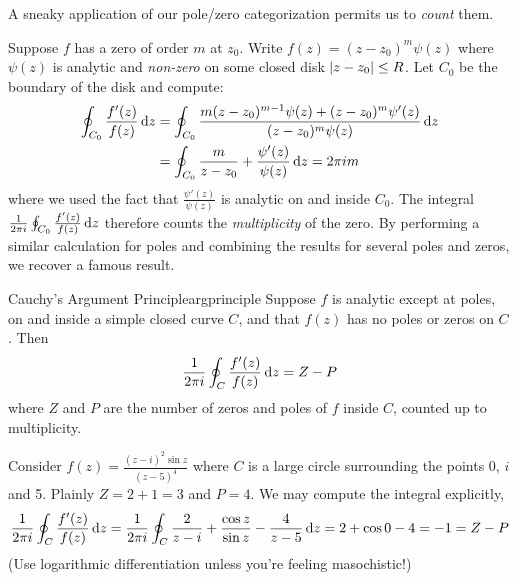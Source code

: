 
A sneaky application of our pole/zero categorization permits us to \emph{count} them.\smallbreak

Suppose $f$ has a zero of order $m$ at $z_0$. Write $f(z)=(z-z_0)^m\psi(z)$ where $\psi(z)$ is analytic and \emph{non-zero} on some closed disk $\left| z-z_0\right|\le R$. Let $C_0$ be the boundary of the disk and compute:
	\begin{align*}
		\oint_{C_0}\frac{f'(z)}{f(z)}\,{\mathrm{d} z}
		&=\oint_{C_0}\frac{m(z-z_0)^{m-1}\psi(z)+(z-z_0)^m\psi'(z)}{(z-z_0)^m\psi(z)} \,{\mathrm{d} z}\\
		&=\oint_{C_0}\frac m{z-z_0}+\frac{\psi'(z)}{\psi(z)}\,{\mathrm{d} z}
		=2\pi im
	\end{align*}
	where we used the fact that $\frac{\psi'(z)}{\psi(z)}$ is analytic on and inside $C_0$.	The integral $\frac 1{2\pi i}\oint_{C_0}\frac{f'(z)}{f(z)}\,{\mathrm{d} z}$ therefore counts the \emph{multiplicity} of the zero. By performing a similar calculation for poles and combining the results for several poles and zeros, we recover a famous result.

	
\begin{thm}{Cauchy's Argument Principle}{argprinciple}
	Suppose $f$ is analytic except at poles,\footnotemark{} on and inside a simple closed curve $C$, and that $f(z)$ has no poles or zeros on $C$. Then
	\[
		\frac 1{2\pi i}\oint_C\frac{f'(z)}{f(z)}\,{\mathrm{d} z} =Z-P
	\]
	where $Z$ and $P$ are the number of zeros and poles of $f$ inside $C$, counted up to multiplicity.
\end{thm}



\begin{example}{}{}
	Consider $f(z)=\frac{(z-i)^2\sin z}{(z-5)^4}$ where $C$ is a large circle surrounding the points 0, $i$ and 5. Plainly $Z=2+1=3$ and $P=4$. We may compute the integral explicitly,
	\[
		\frac 1{2\pi i}\oint_C\frac{f'(z)}{f(z)}\,{\mathrm{d} z} =\frac 1{2\pi i}\oint_C\frac 2{z-i}+\frac{\cos z}{\sin z}-\frac 4{z-5}\,{\mathrm{d} z} =2+\cos 0-4=-1 =Z-P
	\]
	(Use logarithmic differentiation unless you're feeling masochistic!)
\end{example}

\goodbreak


